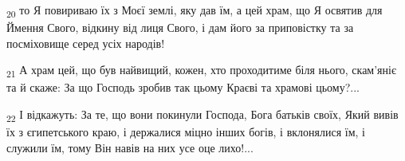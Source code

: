 \begin{tcolorbox}
\textsubscript{20} то Я повириваю їх з Моєї землі, яку дав їм, а цей храм, що Я освятив для Ймення Свого, відкину від лиця Свого, і дам його за приповістку та за посміховище серед усіх народів!
\end{tcolorbox}
\begin{tcolorbox}
\textsubscript{21} А храм цей, що був найвищий, кожен, хто проходитиме біля нього, скам'яніє та й скаже: За що Господь зробив так цьому Краєві та храмові цьому?...
\end{tcolorbox}
\begin{tcolorbox}
\textsubscript{22} І відкажуть: За те, що вони покинули Господа, Бога батьків своїх, Який вивів їх з єгипетського краю, і держалися міцно інших богів, і вклонялися їм, і служили їм, тому Він навів на них усе оце лихо!...
\end{tcolorbox}
